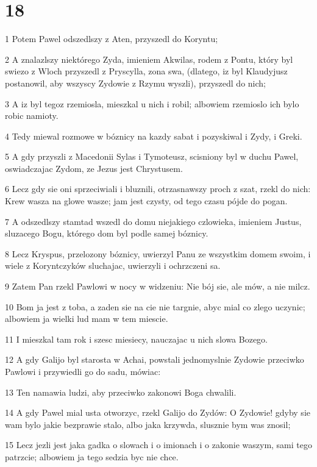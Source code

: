 \chapter{18}

\par 1 Potem Pawel odszedlszy z Aten, przyszedl do Koryntu;
\par 2 A znalazlszy niektórego Zyda, imieniem Akwilas, rodem z Pontu, który byl swiezo z Wloch przyszedl z Pryscylla, zona swa, (dlatego, iz byl Klaudyjusz postanowil, aby wszyscy Zydowie z Rzymu wyszli), przyszedl do nich;
\par 3 A iz byl tegoz rzemiosla, mieszkal u nich i robil; albowiem rzemioslo ich bylo robic namioty.
\par 4 Tedy miewal rozmowe w bóznicy na kazdy sabat i pozyskiwal i Zydy, i Greki.
\par 5 A gdy przyszli z Macedonii Sylas i Tymoteusz, scisniony byl w duchu Pawel, oswiadczajac Zydom, ze Jezus jest Chrystusem.
\par 6 Lecz gdy sie oni sprzeciwiali i bluznili, otrzasnawszy proch z szat, rzekl do nich: Krew wasza na glowe wasze; jam jest czysty, od tego czasu pójde do pogan.
\par 7 A odszedlszy stamtad wszedl do domu niejakiego czlowieka, imieniem Justus, sluzacego Bogu, którego dom byl podle samej bóznicy.
\par 8 Lecz Kryspus, przelozony bóznicy, uwierzyl Panu ze wszystkim domem swoim, i wiele z Koryntczyków sluchajac, uwierzyli i ochrzczeni sa.
\par 9 Zatem Pan rzekl Pawlowi w nocy w widzeniu: Nie bój sie, ale mów, a nie milcz.
\par 10 Bom ja jest z toba, a zaden sie na cie nie targnie, abyc mial co zlego uczynic; albowiem ja wielki lud mam w tem miescie.
\par 11 I mieszkal tam rok i szesc miesiecy, nauczajac u nich slowa Bozego.
\par 12 A gdy Galijo byl starosta w Achai, powstali jednomyslnie Zydowie przeciwko Pawlowi i przywiedli go do sadu, mówiac:
\par 13 Ten namawia ludzi, aby przeciwko zakonowi Boga chwalili.
\par 14 A gdy Pawel mial usta otworzyc, rzekl Galijo do Zydów: O Zydowie! gdyby sie wam bylo jakie bezprawie stalo, albo jaka krzywda, slusznie bym was znosil;
\par 15 Lecz jezli jest jaka gadka o slowach i o imionach i o zakonie waszym, sami tego patrzcie; albowiem ja tego sedzia byc nie chce.
